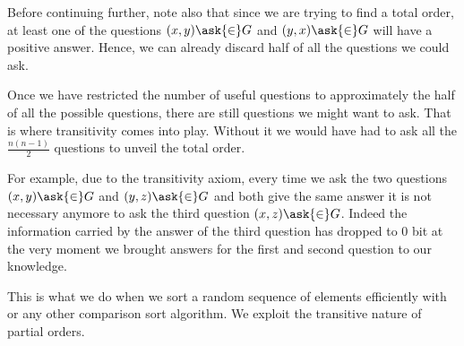 Before continuing further, note also that since we are trying to find a total
order, at least one of the questions $(x, y) \ask{\in} G$ and $(y, x)
\ask{\in} G$ will have a positive answer. Hence, we can already discard
half of all the questions we could ask.

Once we have restricted the number of useful questions to approximately the
half of all the possible questions, there are still  questions we
might want to ask. That is where transitivity comes into play. Without it we
would have had to ask all the $\frac{n (n-1)}{2}$ questions to unveil the total
order.

For example, due to the transitivity axiom, every time we ask the two questions
$(x, y) \ask{\in} G$ and $(y, z) \ask{\in} G$ and both give the
same answer it is not necessary anymore to ask the third question $(x, z)
\ask{\in} G$. Indeed the information carried by the answer of the
third question has dropped to 0 bit at the very moment we brought answers for
the first and second question to our knowledge.

This is what we do when we sort a random sequence of elements
efficiently with \quicksort or any other  comparison sort
algorithm. We exploit the transitive nature of partial orders.
